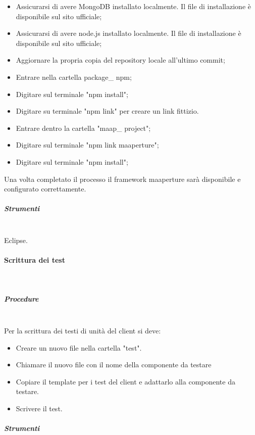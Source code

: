 \begin{itemize}
\item Assicurarsi di avere MongoDB installato localmente. Il file di installazione è disponibile sul sito ufficiale;
\item Assicurarsi di avere node.js installato localmente.  Il file di installazione è disponibile sul sito ufficiale;
\item Aggiornare la propria copia del repository locale all'ultimo commit;
\item Entrare nella cartella package\_ npm;
\item Digitare sul terminale "npm install";
\item Digitare su terminale "npm link" per creare un link fittizio.
\item Entrare dentro la cartella "maap\_ project";
\item Digitare sul terminale "npm link maaperture";
\item Digitare sul terminale "npm install";

\end{itemize}

Una volta completato il processo il framework maaperture sarà disponibile e configurato correttamente.

\subparagraph{Strumenti} \hfill \\

Eclipse.

\paragraph{Scrittura dei test} \hfill \\

\subparagraph{Procedure} \hfill \\
Per la scrittura dei testi di unità del client si deve:

\begin{itemize}
\item Creare un nuovo file nella cartella "test".
\item Chiamare il nuovo file con il nome della componente da testare
\item Copiare il template per i test del client e adattarlo alla componente da testare.
\item Scrivere il test.
\end{itemize}



\subparagraph{Strumenti} \hfill \\

